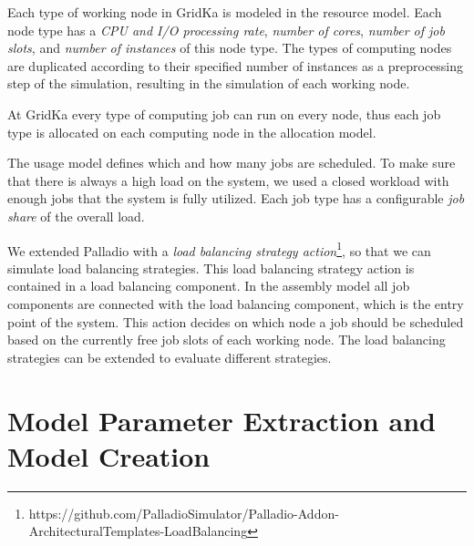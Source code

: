 \documentclass{webofc}
\begin{document}
Each type of working node in GridKa is modeled in the resource model. Each node type has a \textit{CPU and I/O processing rate}, \textit{number of cores}, \textit{number of job slots}, and \textit{number of instances} of this node type. The types of computing nodes are duplicated according to their specified number of instances as a preprocessing step of the simulation, resulting in the simulation of each working node.

At GridKa every type of computing job can run on every node, thus each job type is allocated on each computing node in the allocation model.

The usage model defines which and how many jobs are scheduled. To make sure that there is always a high load on the system, we used a closed workload with enough jobs that the system is fully utilized. Each job type has a configurable \textit{job share} of the overall load.

We extended Palladio with a \textit{load balancing strategy action}\footnote{https://github.com/PalladioSimulator/Palladio-Addon-ArchitecturalTemplates-LoadBalancing}, so that we can simulate load balancing strategies.
This load balancing strategy action is contained in a load balancing component.
In the assembly model all job components are connected with the load balancing component, which is the entry point of the system.
This action decides on which node a job should be scheduled based on the currently free job slots of each working node. The load balancing strategies can be extended to evaluate different strategies.



\section{Model Parameter Extraction and Model Creation}
\label{sec:param}
\end{document}
